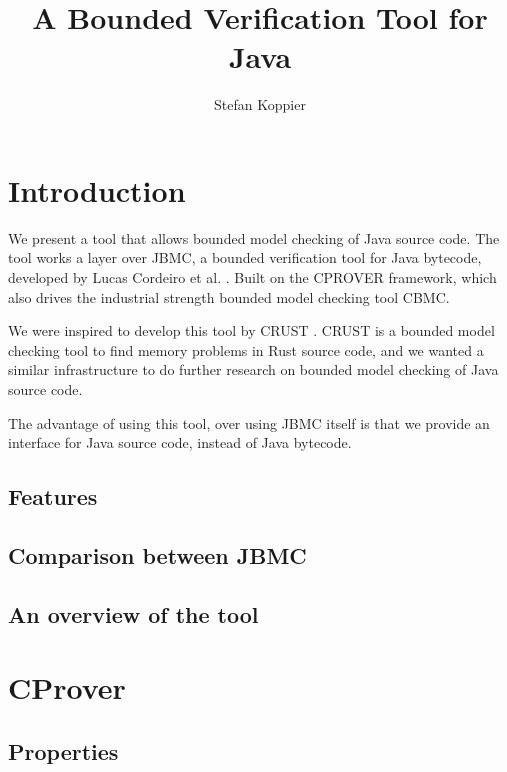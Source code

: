 \documentclass[a4paper]{book}
\begin{document}
\title{A Bounded Verification Tool for Java}
\author{Stefan Koppier}
\maketitle

\chapter*{Introduction}

We present a tool that allows bounded model checking of Java source code. The
tool works a layer over JBMC, a bounded verification tool for Java bytecode, 
developed by Lucas Cordeiro et al. \cite{ckkst2018}. Built on the CPROVER
framework, which also drives the industrial strength bounded model checking tool 
CBMC.

We were inspired to develop this tool by CRUST \cite{toman2015crust}. CRUST is a 
bounded model checking tool to find memory problems in Rust source code, and we 
wanted a similar infrastructure to do further research on bounded model checking
of Java source code.

The advantage of using this tool, over using JBMC itself is that we provide an 
interface for Java source code, instead of Java bytecode.

\section*{Features}

\section*{Comparison between JBMC}

\section*{An overview of the tool}

\tableofcontents



\chapter{CProver}

\section{Properties}
\end{document}
